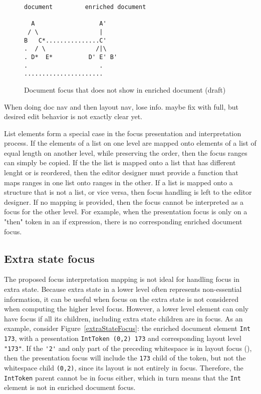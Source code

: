 \begin{figure}
\begin{small}
\begin{center}
\begin{verbatim}
document         enriched document

  A                  A'
 / \                 |
B   C*...............C'
.  / \              /|\
. D*  E*          D' E' B'
.                    .
......................    
\end{verbatim}
\caption{Document focus that does not show in enriched document (draft)}\label{unpresentableFocus} 
\end{center}
\end{small}
\end{figure}
\ec

\bc When doing doc nav and then layout nav, lose info. maybe fix with full, but desired edit behavior is not exactly clear yet.
\ec

List elements form a special case in the focus presentation and interpretation process. If the elements of a list on one level are mapped onto elements of a list of equal length on another level, while preserving the order, then the focus ranges can simply be copied. If the the list is mapped onto a list that has different lenght or is reordered, then the editor designer must provide a function that maps ranges in one list onto ranges in the other. If a list is mapped onto a structure that is not a list, or vice versa, then focus handling is left to the editor designer. If no mapping is provided, then the focus cannot be interpreted as a focus for the other level. For example, when the presentation focus is only on a "then" token in an if expression, there is no corresponding enriched document focus.


%																
\subsection{Extra state focus}

The proposed focus interpretation mapping is not ideal for handling focus in extra state. Because extra state in a lower level often represents non-essential information, it can be useful when focus on the extra state is not considered when computing the higher level focus. However, a lower level element can only have focus if all its children, including extra state children are in focus. As an example, consider Figure~\ref{extraStateFocus}: the enriched document element \verb|Int 173|, with a presentation \verb|IntToken (0,2) 173| and corresponding layout level \verb|"|\textvisiblespace\textvisiblespace\verb|173"|. If the \verb|'2'| and only part of the preceding whitespace is in layout focus ({\tt \textvisiblespace{}}), then the presentation focus will include the \verb|173| child of the token, but not the whitespace child \verb|(0,2)|, since its layout is not entirely in focus. Therefore, the \verb|IntToken| parent cannot be in focus either, which in turn means that the \verb|Int| element is not in enriched document focus. 

